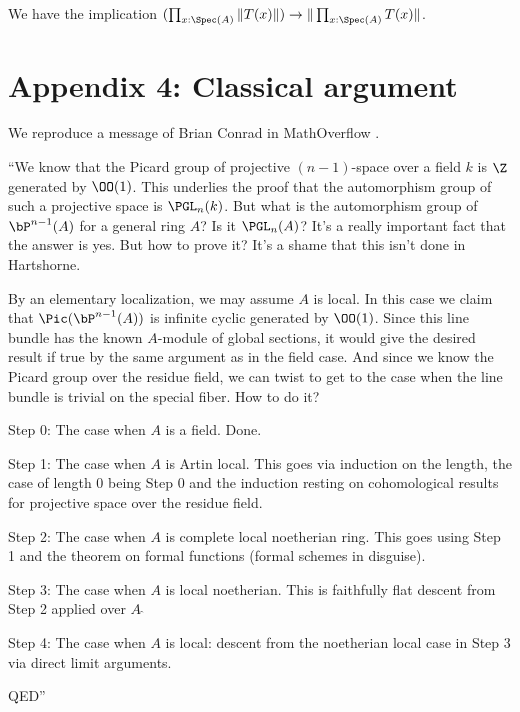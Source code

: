 \begin{proposition}\label{c2}
  We have the implication $(\prod_{x:\Spec(A)}\|T(x)\|)\rightarrow \|\prod_{x:\Spec(A)}T(x)\|$.
\end{proposition}

\newpage

\section*{Appendix 4: Classical argument}

We reproduce a message of Brian Conrad in MathOverflow \cite{conrad-mathoverflow-16324}.

\medskip

``We know that the Picard group of projective $(n-1)$-space over a field $k$ is $\Z$
generated by $\OO(1)$.
This underlies the proof that the automorphism group of such a projective space is $\PGL_n(k)$.
But what is the automorphism group of $\bP^{n-1}(A)$ for a general ring $A$? Is it $\PGL_n(A)$?
It's a really important fact that the answer is yes.
But how to prove it? It's a shame that this isn't done in Hartshorne.

By an elementary localization, we may assume $A$ is local.
In this case we claim that $\Pic(\bP^{n-1}(A))$ is infinite cyclic generated by $\OO(1)$.
Since this line bundle has the known $A$-module of global sections,
it would give the desired result if true by the same argument as in the field case.
And since we know the Picard group over the residue field, we can twist
to get to the case when the line bundle is trivial on the special fiber. How to do it?

\medskip

 Step 0: The case when $A$ is a field. Done.

 \medskip

 Step 1: The case when $A$ is Artin local.
 This goes via induction on the length, the case of length $0$ being Step $0$
 and the induction resting on cohomological results for projective space over the residue field.

  \medskip

 Step 2: The case when $A$ is complete local noetherian ring. This goes
 using Step 1 and the theorem on formal functions (formal schemes in disguise).

  \medskip

 Step 3: The case when $A$ is local noetherian.
 This is faithfully flat descent from Step 2 applied over $A~\widehat{}$

 \medskip
 
 Step 4: The case when $A$ is local:
 descent from the noetherian local case in Step 3 via direct limit arguments.

\medskip
 
QED''
